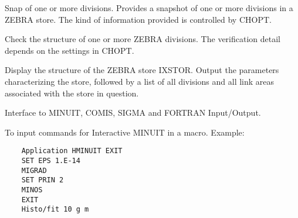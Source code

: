    \par
Snap of one or more divisions.  Provides a snapshot of one or more 
   divisions in a ZEBRA store.  The kind of information provided is controlled 
   by CHOPT.  

\ENDCMD


\BEGARG
{}
\ENDARG
{}
\ENDOPT

   \par
Check the structure of one or more ZEBRA divisions.  The verification 
   detail depends on the settings in CHOPT.  

\ENDCMD


\BEGARG
{}
\ENDARG

   \par
Display the structure of the ZEBRA store IXSTOR.  Output the parameters 
   characterizing the store, followed by a list of all divisions and all link 
   areas associated with the store in question.  

\ENDCMD
{}
\ifMENUtext
   \par
Interface to MINUIT, COMIS, SIGMA and FORTRAN Input/Output.  


\fi


   \par
To input commands for Interactive MINUIT in a macro.  Example:  
\begin{verbatim}
    Application HMINUIT EXIT
    SET EPS 1.E-14
    MIGRAD
    SET PRIN 2
    MINOS
    EXIT
    Histo/fit 10 g m
\end{verbatim}

\ENDCMD


